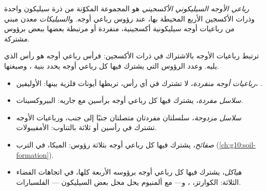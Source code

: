 \begin{definition}\label{def:g11:minerals:silicate}
\emph{رباعي الأوجه السيليكوني الأكسجيني} هو
المجموعة  المكوّنة من ذرة سيليكون واحدة وذرات الأكسجين الأربع
المحيطة بها، عند رؤوس رباعي أوجه.
و\emph{السيليكات} معدن مبني من رباعيات أوجه سيليكونية أكسجينية،
منفردة أو مرتبطة بعضها ببعض برؤوس مشتركة.
\end{definition}

ترتبط رباعيات الأوجه بالاشتراك في ذرات الأكسجين: فرأس رباعي أوجه هو
رأس الذي يليه. وعدد الرؤوس التي يشترك فيها كل رباعي أوجه يحدد
بنية ، وصيغتها.
\begin{itemize}
  \item \emph{رباعيات أوجه منفردة}، لا تشترك في أي رأس، تربطها
        أيونات فلزية بينها: الأوليفين، .
  \item \emph{سلاسل مفردة}، يشترك فيها كل رباعي أوجه برأسين مع
        جاريه: البيروكسينات.
  \item \emph{سلاسل مزدوجة}، سلسلتان مفردتان متصلتان جنبًا إلى جنب،
        ورباعيات الأوجه تشترك في رأسين أو ثلاثة بالتناوب: الأمفيبولات.
  \item \emph{صفائح}، يشترك فيها كل رباعي أوجه بثلاثة رؤوس: الميكا،
         في الترب (\cref{ch:g10:soil-formation}).
  \item \emph{هياكل}، يشترك فيها كل رباعي أوجه برؤوسه الأربعة كلها، في
        اتجاهات الفضاء الثلاثة: الكوارتز، ، و--- مع ألمنيوم
        يحل محل بعض السيليكون --- الفلسبارات.
\end{itemize}

